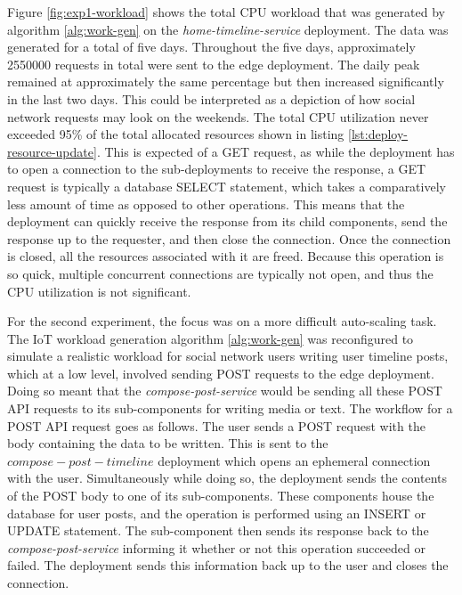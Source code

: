 Figure \ref{fig:exp1-workload} shows the total CPU workload that was generated by algorithm \ref{alg:work-gen} on the \textit{home-timeline-service} deployment. The data was generated for a total of five days. Throughout the five days, approximately \num[group-separator={,}]{2550000} requests in total were sent to the edge deployment. The daily peak remained at approximately the same percentage but then increased significantly in the last two days. This could be interpreted as a depiction of how social network requests may look on the weekends. The total CPU utilization never exceeded 95\% of the total allocated resources shown in listing \ref{lst:deploy-resource-update}. This is expected of a GET request, as while the deployment has to open a connection to the sub-deployments to receive the response, a GET request is typically a database SELECT statement, which takes a comparatively less amount of time as opposed to other operations. This means that the deployment can quickly receive the response from its child components, send the response up to the requester, and then close the connection. Once the connection is closed, all the resources associated with it are freed. Because this operation is so quick, multiple concurrent connections are typically not open, and thus the CPU utilization is not significant.\par

For the second experiment, the focus was on a more difficult auto-scaling task. The IoT workload generation algorithm \ref{alg:work-gen} was reconfigured to simulate a realistic workload for social network users writing user timeline posts, which at a low level, involved sending POST requests to the edge deployment. Doing so meant that the \textit{compose-post-service} would be sending all these POST API requests to its sub-components for writing media or text. The workflow for a POST API request goes as follows. The user sends a POST request with the body containing the data to be written. This is sent to the $compose-post-timeline$ deployment which opens an ephemeral connection with the user. Simultaneously while doing so, the deployment sends the contents of the POST body to one of its sub-components. These components house the database for user posts, and the operation is performed using an INSERT or UPDATE statement. The sub-component then sends its response back to the \textit{compose-post-service} informing it whether or not this operation succeeded or failed. The deployment sends this information back up to the user and closes the connection.\par

